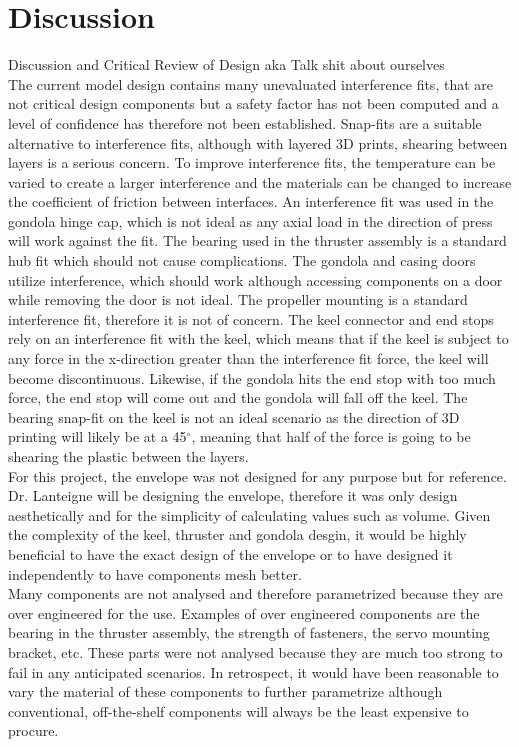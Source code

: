 \documentclass[../main.tex]{subfiles}
\begin{document}
\chapter{Discussion}

Discussion and Critical Review of Design aka Talk shit about ourselves
\\
The current model design contains many unevaluated interference fits, that are not critical design components but a safety factor has not been computed and a level of confidence has therefore not been established. Snap-fits are a suitable alternative to interference fits, although with layered 3D prints, shearing between layers is a serious concern. To improve interference fits, the temperature can be varied to create a larger interference and the materials can be changed to increase the coefficient of friction between interfaces. An interference fit was used in the gondola hinge cap, which is not ideal as any axial load in the direction of press will work against the fit. The bearing used in the thruster assembly is a standard hub fit which should not cause complications. The gondola and casing doors utilize interference, which should work although accessing components on a door while removing the door is not ideal.  The propeller mounting is a standard interference fit, therefore it is not of concern. The keel connector and end stops rely on an interference fit with the keel, which means that if the keel is subject to any force in the x-direction greater than the interference fit force, the keel will become discontinuous. Likewise, if the gondola hits the end stop with too much force, the end stop will come out and the gondola will fall off the keel. The bearing snap-fit on the keel is not an ideal scenario as the direction of 3D printing will likely be at a 45$^{\circ}$, meaning that half of the force is going to be shearing the plastic between the layers.
\\
For this project, the envelope was not designed for any purpose but for reference. Dr. Lanteigne will be designing the envelope, therefore it was only design aesthetically and for the simplicity of calculating values such as volume. Given the complexity of the keel, thruster and gondola desgin, it would be highly beneficial to have the exact design of the envelope or to have designed it independently to have components mesh better. 
\\
Many components are not analysed and therefore parametrized because they are over engineered for the use. Examples of over engineered components are the bearing in the thruster assembly, the strength of fasteners, the servo mounting bracket, etc. These parts were not analysed because they are much too strong to fail in any anticipated scenarios. In retrospect, it would have been reasonable to vary the material of these components to further parametrize although conventional, off-the-shelf components will always be the least expensive to procure.
\end{document}

